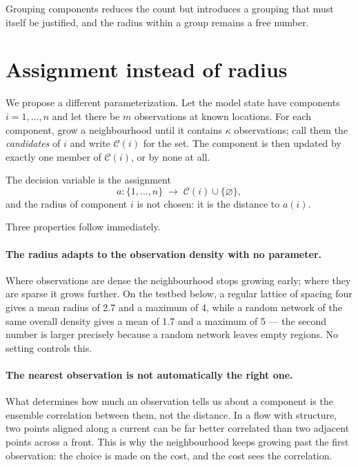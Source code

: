 \documentclass[11pt,a4paper]{article}
\begin{document}
Grouping components reduces the count but introduces a grouping that must
itself be justified, and the radius within a group remains a free number.

\section{Assignment instead of radius}

We propose a different parameterization. Let the model state have components
$i = 1, \dots, n$ and let there be $m$ observations at known locations. For each
component, grow a neighbourhood until it contains $\kappa$ observations; call
them the \emph{candidates} of $i$ and write $\mathcal{C}(i)$ for the set. The
component is then updated by exactly one member of $\mathcal{C}(i)$, or by none
at all.

The decision variable is the assignment
%
\begin{equation}
  a : \{1, \dots, n\} \;\longrightarrow\; \mathcal{C}(i) \cup \{\varnothing\},
\end{equation}
%
and the radius of component $i$ is not chosen: it is the distance to $a(i)$.

Three properties follow immediately.

\paragraph{The radius adapts to the observation density with no parameter.}
Where observations are dense the neighbourhood stops growing early; where they
are sparse it grows further. On the testbed below, a regular lattice of spacing
four gives a mean radius of 2.7 and a maximum of 4, while a random network of
the same overall density gives a mean of 1.7 and a maximum of 5 --- the second
number is larger precisely because a random network leaves empty regions. No
setting controls this.

\paragraph{The nearest observation is not automatically the right one.}
What determines how much an observation tells us about a component is the
ensemble correlation between them, not the distance. In a flow with structure,
two points aligned along a current can be far better correlated than two
adjacent points across a front. This is why the neighbourhood keeps growing
past the first observation: the choice is made on the cost, and the cost sees
the correlation.
\end{document}

